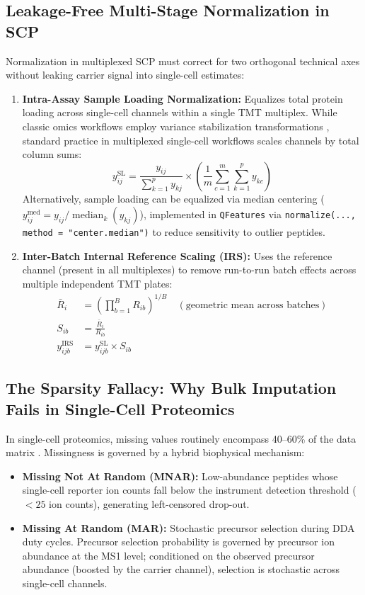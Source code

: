 \documentclass[11pt,twoside,openright]{book}
\begin{document}
\subsection{Leakage-Free Multi-Stage Normalization in SCP}

Normalization in multiplexed SCP must correct for two orthogonal technical axes without leaking carrier signal into single-cell estimates:
\begin{enumerate}
    \item \textbf{Intra-Assay Sample Loading Normalization:} Equalizes total protein loading across single-cell channels within a single TMT multiplex. While classic omics workflows employ variance stabilization transformations \cite{huber2002variance}, standard practice in multiplexed single-cell workflows scales channels by total column sums:
    \begin{equation}
    y_{ij}^{\text{SL}} = \frac{y_{ij}}{\sum_{k=1}^p y_{kj}} \times \left( \frac{1}{m} \sum_{c=1}^m \sum_{k=1}^p y_{kc} \right)
    \end{equation}
    Alternatively, sample loading can be equalized via median centering ($y_{ij}^{\text{med}} = y_{ij} / \operatorname{median}_k(y_{kj})$), implemented in \texttt{QFeatures} via \texttt{normalize(..., method = "center.median")} to reduce sensitivity to outlier peptides.
    \item \textbf{Inter-Batch Internal Reference Scaling (IRS):} Uses the reference channel (present in all multiplexes) to remove run-to-run batch effects across multiple independent TMT plates:
    \begin{align}
    \bar{R}_i &= \left( \prod_{b=1}^B R_{ib} \right)^{1/B} \quad (\text{geometric mean across batches}) \\
    S_{ib} &= \frac{\bar{R}_i}{R_{ib}} \\
    y_{ijb}^{\text{IRS}} &= y_{ijb}^{\text{SL}} \times S_{ib}
    \end{align}
\end{enumerate}

\subsection{The Sparsity Fallacy: Why Bulk Imputation Fails in Single-Cell Proteomics}

In single-cell proteomics, missing values routinely encompass 40--60\% of the data matrix \cite{vanderaa2021scp, brunner2022ultra}. Missingness is governed by a hybrid biophysical mechanism:
\begin{itemize}
    \item \textbf{Missing Not At Random (MNAR):} Low-abundance peptides whose single-cell reporter ion counts fall below the instrument detection threshold ($<25$ ion counts), generating left-censored drop-out.
    \item \textbf{Missing At Random (MAR):} Stochastic precursor selection during DDA duty cycles. Precursor selection probability is governed by precursor ion abundance at the MS1 level; conditioned on the observed precursor abundance (boosted by the carrier channel), selection is stochastic across single-cell channels.
\end{itemize}
\end{document}
